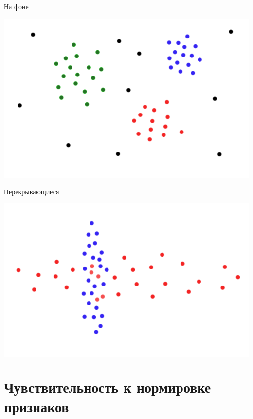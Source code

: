 \documentclass[10pt]{beamer}
\begin{document}
\begin{frame}{На фоне}
	\begin{center}
	  \includegraphics[height=0.6 \textheight, keepaspectratio = true]{images/cluster5}  
	\end{center}
\end{frame}

\begin{frame}{Перекрывающиеся}
	\begin{center}
	  \includegraphics[height=0.6 \textheight, keepaspectratio = true]{images/cluster6}  
	\end{center}
\end{frame}

\section{Чувствительность к нормировке признаков}
\end{document}
